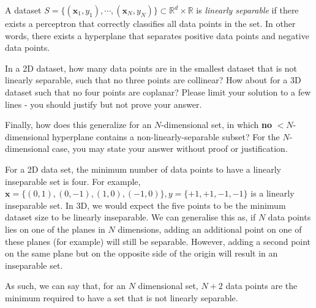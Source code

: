 \begin{problem}[4]
  A dataset $S = \{(\mathbf{x}_1, y_1),\cdots,(\mathbf{x}_N, y_N)\} \subset \mathbb{R}^d \times \mathbb{R}$ is \emph{linearly separable} if there exists a perceptron that correctly classifies all data points in the set. In other words, there exists a hyperplane that separates positive data points and negative data points.

  In a 2D dataset, how many data points are in the smallest dataset that is not linearly separable, such that no three points are collinear? How about for a 3D dataset such that no four points are coplanar? Please limit your solution to a few lines - you should justify but not prove your answer.

  Finally, how does this generalize for an $N$-dimensional set, in which \textbf{no} $<$$N$-dimensional hyperplane contains a non-linearly-separable subset? For the $N$-dimensional case, you may state your answer without proof or justification.
\end{problem}
\begin{solution}
 For a 2D data set, the minimum number of data points to have a linearly inseparable set is four. For example, $\mathbf{x}=\{(0,1),(0,-1),(1,0),(-1,0)\}, y=\{+1,+1,-1,-1\}$ is a linearly inseparable set. In 3D, we would expect the five points to be the minimum dataset size to be linearly inseparable. We can generalise this as, if $N$ data points lies on one of the planes in $N$ dimensions, adding an additional point on one of these planes (for example) will still be separable. However, adding a second point on the same plane but on the opposite side of the origin will result in an inseparable set. 

 As such, we can say that, for an $N$ dimensional set, $N+2$ data points are the minimum required to have a set that is not linearly separable.
\end{solution}

